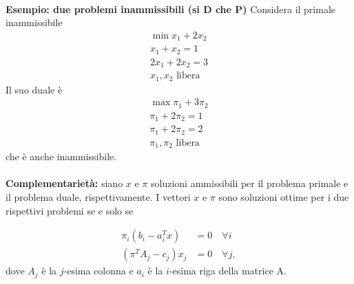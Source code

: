 \documentclass[a4paper, 11pt]{article}
\begin{document}
        \paragraph{}
        \textbf{Esempio: due problemi inammissibili (si D che P)}
        Considera il primale inammissibile
        \begin{align*}
            \min x_1 + 2x_2 \\
            x_1 + x_2 = 1 \\
            2x_1 + 2x_2 = 3 \\
            x_1, x_2 \text{ libera }
        \end{align*}
        Il suo duale è
        \begin{align*}
            \max \pi_1 + 3\pi_2 \\
            \pi_1 + 2\pi_2 = 1 \\
            \pi_1 + 2\pi_2 = 2 \\
            \pi_1, \pi_2 \text{ libera }
        \end{align*}
        che è anche inammissibile.
        
        \paragraph{}
        \textbf{Complementarietà: } siano $x$ e $\pi$ soluzioni ammissibili per il problema primale e il problema duale, rispettivamente. I vettori $x$ e $\pi$ sono soluzioni ottime per i due rispettivi problemi se e solo se

        \begin{align*}
            \pi_i(b_i - a^T_i x) &= 0 \quad \forall i \\
            (\pi^T A_j - c_j)x_j &= 0 \quad \forall j,
        \end{align*}
        dove $A_j$ è la $j$-esima colonna e $a_i$ è la $i$-esima riga della matrice A.
        
\end{document}
